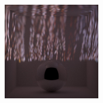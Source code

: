 \begin{figure}[]
\begin{subfigure}{\textwidth}
\begin{subfigure}{0.19\textwidth}
            \caption*{}
        \end{subfigure}
        \hfill
        \begin{subfigure}{0.19\textwidth}
            \centering
            \includegraphics[width=\textwidth]{images/04-experiment03/ball_dof/wood/pixel_proj.jpg}
            \caption*{}
        \end{subfigure}


\end{subfigure}
\end{figure}
